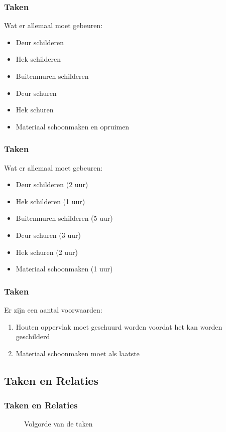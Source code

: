 \documentclass{beamer}
\theoremstyle{definition}
\newcommand{\inputtikz}[1]{}
\begin{document}
\begin{frame}
    \frametitle{Taken}
    Wat er allemaal moet gebeuren:
     \begin{itemize}
    	\item Deur schilderen
	\item Hek schilderen
	\item Buitenmuren schilderen
	\item<2-> Deur schuren
	\item<2-> Hek schuren
	\item<3-> Materiaal schoonmaken en opruimen
    \end{itemize}
\end{frame}

\begin{frame}
    \frametitle{Taken}
    Wat er allemaal moet gebeuren:
     \begin{itemize}
    	\item Deur schilderen (2 uur)
	\item Hek schilderen (1 uur)
	\item Buitenmuren schilderen (5 uur)
	\item Deur schuren (3 uur)
	\item Hek schuren (2 uur)
	\item Materiaal schoonmaken (1 uur)
    \end{itemize}
\end{frame}

\begin{frame}
    	\frametitle{Taken}
   	Er zijn een aantal voorwaarden:
	\begin{enumerate}
	    	\item Houten oppervlak moet geschuurd worden voordat het kan worden geschilderd
		\item Materiaal schoonmaken moet als laatste
	\end{enumerate}
\end{frame}

\subsection{Taken en Relaties}
\begin{frame}
	\frametitle{Taken en Relaties}
	\vspace{-1em}
	\begin{figure}[ht]
		\makebox[\textwidth][c]{\resizebox{.8\paperwidth}{!}{
			\inputtikz{precendence_graph}
		}}
		\vspace{-1em}
		\caption{Volgorde van de taken}
	\end{figure}
\end{frame}
\end{document}
